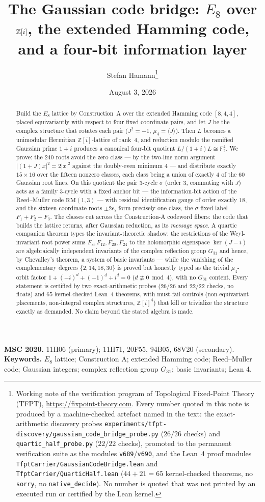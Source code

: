 \documentclass[11pt,a4paper]{article}
\title{The Gaussian code bridge: $E_8$ over $\Z[i]$, the extended
Hamming code, and a four-bit information layer}
\author{Stefan Hamann\thanks{Working note of the verification program
of Topological Fixed-Point Theory (TFPT),
\url{https://fixpoint-theory.com}.  Every number quoted in this note
is produced by a machine-checked artefact named in the text: the
exact-arithmetic discovery probes
\texttt{experiments/tfpt-discovery/gaussian\_code\_bridge\_probe.py}
($26/26$ checks) and \texttt{quartic\_half\_probe.py} ($22/22$
checks), promoted to the permanent verification suite as the modules
\texttt{v689}/\texttt{v690}, and the Lean~4 proof modules
\texttt{TfptCarrier/GaussianCodeBridge.lean} and
\texttt{TfptCarrier/QuarticHalf.lean} ($44+21=65$ kernel-checked
theorems, no \texttt{sorry}, no \texttt{native\_decide}).  No number
is quoted that was not printed by an executed run or certified by the
Lean kernel.}}
\date{August 3, 2026}
\theoremstyle{remark}
\newcommand{\F}{\mathbb F}
\newcommand{\Z}{\mathbb Z}
\begin{document}
\maketitle

\begin{abstract}
Build the $E_8$ lattice by Construction~A over the extended Hamming
code $[8,4,4]$, placed equivariantly with respect to four fixed
coordinate pairs, and let $J$ be the complex structure that rotates
each pair ($J^2=-1$, $\mu_4=\langle J\rangle$).  Then $L$ becomes a
unimodular Hermitian $\Z[i]$-lattice of rank~$4$, and reduction modulo
the ramified Gaussian prime $1+i$ produces a canonical four-bit
quotient $L/(1+i)L\cong\F_2^4$.  We prove: the $240$ roots avoid the
zero class --- by the two-line norm argument
$|(1+J)x|^2=2|x|^2$ against the doubly-even minimum $4$ --- and
distribute exactly $15\times16$ over the fifteen nonzero classes, each
class being a union of exactly $4$ of the $60$ Gaussian root lines.
On this quotient the pair $3$-cycle $\sigma$ (order $3$, commuting
with $J$) acts as a family $3$-cycle with a fixed anchor bit --- the
information-bit action of the Reed--Muller code $\mathrm{RM}(1,3)$ ---
with residual identification gauge of order exactly $18$, and the
sixteen coordinate roots $\pm2e_i$ form precisely one class, the
$\sigma$-fixed label $F_1{+}F_2{+}F_3$.  The classes cut across the
Construction-A codeword fibers: the code that builds the lattice
returns, after Gaussian reduction, as its \emph{message space}.  A
quartic companion theorem types the invariant-theoretic shadow: the
restrictions of the Weyl-invariant root power sums $F_8,F_{12},
F_{20},F_{24}$ to the holomorphic eigenspace $\ker(J-i)$ are
algebraically independent invariants of the complex reflection group
$G_{31}$ and hence, by Chevalley's theorem, a system of basic
invariants --- while the vanishing of the complementary degrees
$\{2,14,18,30\}$ is proved but honestly typed as the trivial
$\mu_4$-orbit factor $1+(-i)^d+(-1)^d+i^d=0$ ($d\not\equiv0\bmod4$),
with no $G_{31}$ content.  Every statement is certified by two
exact-arithmetic probes ($26/26$ and $22/22$ checks, no floats) and
$65$ kernel-checked Lean~4 theorems, with must-fail controls
(non-equivariant placements, non-integral complex structures,
$\Z[i]^4$) that kill or trivialize the structure exactly as demanded.
No claim beyond the stated algebra is made.
\end{abstract}

\medskip
\noindent\textbf{MSC 2020.} 11H06 (primary); 11H71, 20F55, 94B05,
68V20 (secondary).\\
\textbf{Keywords.} $E_8$ lattice; Construction A; extended Hamming
code; Reed--Muller code; Gaussian integers; complex reflection group
$G_{31}$; basic invariants; Lean 4.
\end{document}
